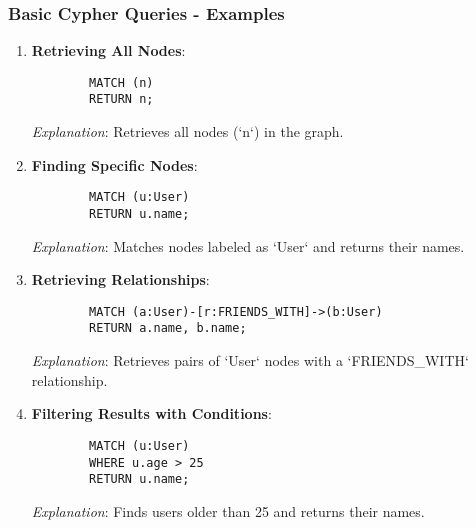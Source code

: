 \documentclass[aspectratio=169]{beamer}
\begin{document}
\begin{frame}[fragile]
    \frametitle{Basic Cypher Queries - Examples}
    \begin{enumerate}
        \item \textbf{Retrieving All Nodes}:
        \begin{lstlisting}
        MATCH (n) 
        RETURN n;
        \end{lstlisting}
        \textit{Explanation}: Retrieves all nodes (`n`) in the graph.

        \item \textbf{Finding Specific Nodes}:
        \begin{lstlisting}
        MATCH (u:User) 
        RETURN u.name;
        \end{lstlisting}
        \textit{Explanation}: Matches nodes labeled as `User` and returns their names.

        \item \textbf{Retrieving Relationships}:
        \begin{lstlisting}
        MATCH (a:User)-[r:FRIENDS_WITH]->(b:User) 
        RETURN a.name, b.name;
        \end{lstlisting}
        \textit{Explanation}: Retrieves pairs of `User` nodes with a `FRIENDS_WITH` relationship.

        \item \textbf{Filtering Results with Conditions}:
        \begin{lstlisting}
        MATCH (u:User) 
        WHERE u.age > 25 
        RETURN u.name;
        \end{lstlisting}
        \textit{Explanation}: Finds users older than 25 and returns their names.
    \end{enumerate}
\end{frame}
\end{document}

